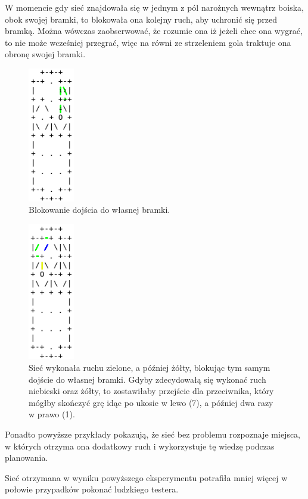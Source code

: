 \documentclass[licencjacka]{pracamgr}
\begin{document}
W momencie gdy sieć znajdowała się w jednym z pól narożnych wewnątrz boiska, obok swojej bramki, to blokowała ona kolejny ruch, aby uchronić się przed bramką. Można wówczas zaobserwować, że rozumie ona iż jeżeli chce ona wygrać, to nie może wcześniej przegrać, więc na równi ze strzeleniem gola traktuje ona obronę swojej bramki.

\begin{figure}[ht!]
  \centering
  \includegraphics[width=20mm]{blok}
  \caption{Blokowanie dojścia do własnej bramki.}
\end{figure}

\begin{figure}[ht!]
  \centering
  \includegraphics[width=20mm]{blok2}
  \caption{Sieć wykonała ruchu zielone, a później żółty, blokując tym samym dojście do własnej bramki. Gdyby zdecydowałą się wykonać ruch niebieski oraz żółty, to zostawiłaby przejście dla przeciwnika, który mógłby skończyć grę idąc po ukosie w lewo (7), a później dwa razy w prawo (1).}
\end{figure}

Ponadto powyższe przykłady pokazują, że sieć bez problemu rozpoznaje miejsca, w których otrzyma ona dodatkowy ruch i wykorzystuje tę wiedzę podczas planowania.

Sieć otrzymana w wyniku powyższego eksperymentu potrafiła mniej więcej w połowie przypadków pokonać ludzkiego testera.
\end{document}
